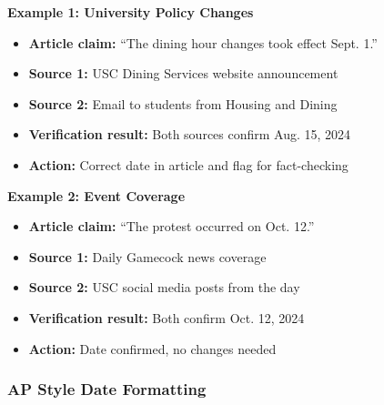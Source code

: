 \documentclass[12pt]{article}
\begin{document}
\begin{examplebox}
\textbf{Example 1: University Policy Changes}
\begin{itemize}
    \item \textbf{Article claim:} ``The dining hour changes took effect Sept. 1.''
    \item \textbf{Source 1:} USC Dining Services website announcement
    \item \textbf{Source 2:} Email to students from Housing and Dining
    \item \textbf{Verification result:} Both sources confirm Aug. 15, 2024
    \item \textbf{Action:} Correct date in article and flag for fact-checking
\end{itemize}
\end{examplebox}

\begin{examplebox}
\textbf{Example 2: Event Coverage}
\begin{itemize}
    \item \textbf{Article claim:} ``The protest occurred on Oct. 12.''
    \item \textbf{Source 1:} Daily Gamecock news coverage
    \item \textbf{Source 2:} USC social media posts from the day
    \item \textbf{Verification result:} Both confirm Oct. 12, 2024
    \item \textbf{Action:} Date confirmed, no changes needed
\end{itemize}
\end{examplebox}

\newpage
\subsubsection{AP Style Date Formatting}
\end{document}
